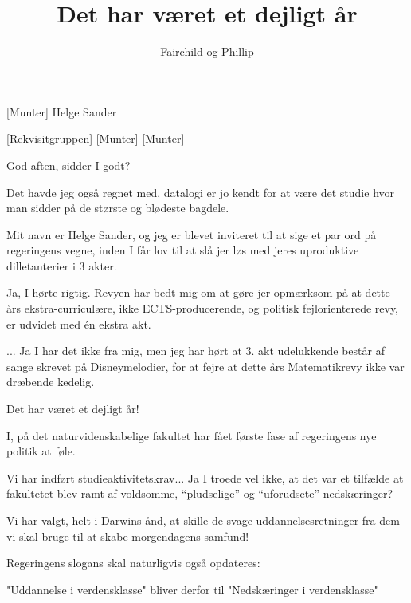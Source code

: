 \documentclass[a4paper,11pt]{article}
\title{Det har været et dejligt år}
\author{Fairchild og Phillip}
\begin{document}
\maketitle

\begin{roles}
[Munter] Helge Sander
\end{roles}

\begin{props}
[Rekvisitgruppen]
[Munter]
[Munter]
\end{props}

\begin{sketch}


 God aften, sidder I godt?

 Det havde jeg også regnet med, datalogi er jo kendt for at være det studie hvor man sidder på de største og blødeste bagdele.

 Mit navn er Helge Sander, og jeg er blevet inviteret til at sige et par ord på regeringens vegne, inden I 
får lov til at slå jer løs med jeres uproduktive dilletanterier i 3 akter.

 Ja, I hørte rigtig. Revyen har bedt mig om at gøre jer opmærksom på at dette års ekstra-curriculære, ikke 
ECTS-producerende, og politisk fejlorienterede revy, er udvidet med én ekstra akt.

  ... Ja I har det ikke fra mig, men jeg har hørt at 3. akt udelukkende består 
af sange skrevet på Disneymelodier, for at fejre at dette års Matematikrevy ikke var dræbende kedelig.

  Det har været et dejligt år!

 I, på det naturvidenskabelige fakultet har fået første fase af regeringens nye politik at føle.

 Vi har indført studieaktivitetskrav... Ja I troede vel ikke, at det var et tilfælde at fakultetet blev ramt af voldsomme, ``pludselige'' og ``uforudsete'' nedskæringer?

 Vi har valgt, helt i Darwins ånd, at skille de svage uddannelsesretninger fra dem vi skal bruge til at skabe 
morgendagens samfund!

 Regeringens slogans skal naturligvis også opdateres:

 "Uddannelse i verdensklasse" bliver derfor til "Nedskæringer i verdensklasse"


\end{sketch}
\end{document}
